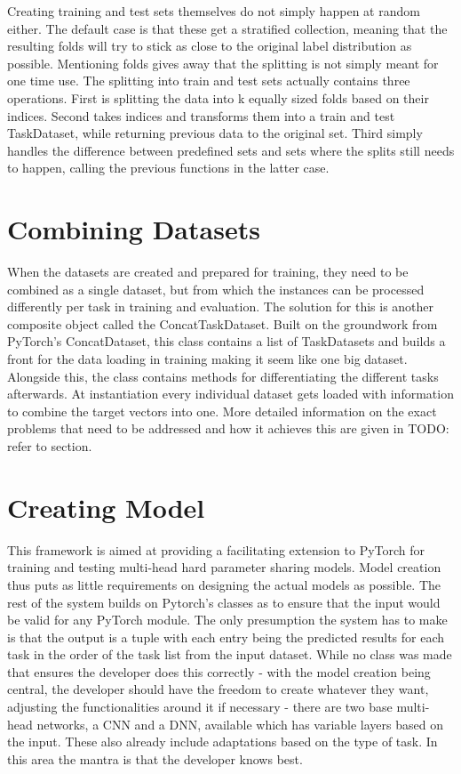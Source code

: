 Creating training and test sets themselves do not simply happen at random either. The default case is that these get a stratified collection, meaning that the resulting folds will try to stick as close to the original label distribution as possible. Mentioning folds gives away that the splitting is not simply meant for one time use. The splitting into train and test sets actually contains three operations. First is splitting the data into k equally sized folds based on their indices. Second takes indices and transforms them into a train and test TaskDataset, while returning previous data to the original set. Third simply handles the difference between predefined sets and sets where the splits still needs to happen, calling the previous functions in the latter case. \\



\section{Combining Datasets}

When the datasets are created and prepared for training, they need to be combined as a single dataset, but from which the instances can be processed differently per task in training and evaluation. The solution for this is another composite object called the ConcatTaskDataset. Built on the groundwork from PyTorch's ConcatDataset, this class contains a list of TaskDatasets and builds a front for the data loading in training making it seem like one big dataset. Alongside this, the class contains methods for differentiating the different tasks afterwards. At instantiation every individual dataset gets loaded with information to combine the target vectors into one. More detailed information on the exact problems that need to be addressed and how it achieves this are given in TODO: refer to section.

\section{Creating Model}

This framework is aimed at providing a facilitating extension to PyTorch for training and testing multi-head hard parameter sharing models. Model creation thus puts as little requirements on designing the actual models as possible. The rest of the system builds on Pytorch's classes as to ensure that the input would be valid for any PyTorch module. The only presumption the system has to make is that the output is a tuple with each entry being the predicted results for each task in the order of the task list from the input dataset. While no class was made that ensures the developer does this correctly - with the model creation being central, the developer should have the freedom to create whatever they want, adjusting the functionalities around it if necessary - there are two base multi-head networks, a CNN and a DNN, available which has variable layers based on the input. These also already include adaptations based on the type of task. In this area the mantra is that the developer knows best. \\


